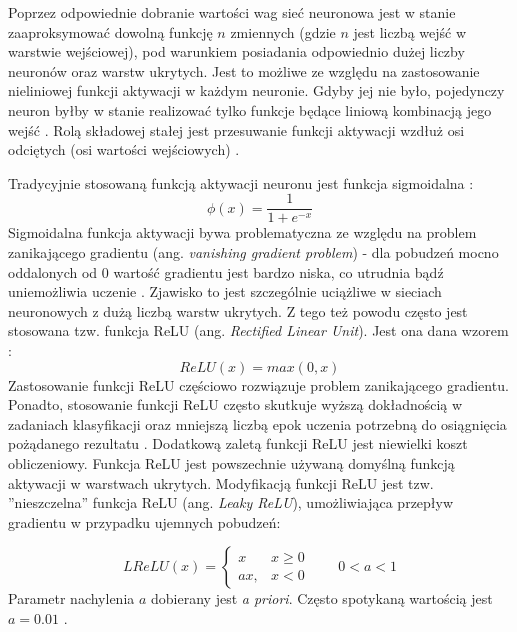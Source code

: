 \documentclass[notitlepage]{report}
\begin{document}
Poprzez odpowiednie dobranie wartości wag sieć neuronowa jest w stanie zaaproksymować dowolną funkcję $n$ zmiennych (gdzie $n$ jest liczbą wejść w warstwie wejściowej), pod warunkiem posiadania odpowiednio dużej liczby neuronów oraz warstw ukrytych. Jest to możliwe ze względu na zastosowanie nieliniowej funkcji aktywacji w każdym neuronie. Gdyby jej nie było, pojedynczy neuron byłby w stanie realizować tylko funkcje będące liniową kombinacją jego wejść \cite{cybenko} \cite{hornik}. Rolą składowej stałej jest przesuwanie funkcji aktywacji wzdłuż osi odciętych (osi wartości wejściowych) \cite{haykin}.

Tradycyjnie stosowaną funkcją aktywacji neuronu jest funkcja sigmoidalna \cite{haykin}:
\begin{equation}
\phi(x) = \frac{1}{1+e^{-x}}
\end{equation}
Sigmoidalna funkcja aktywacji bywa problematyczna ze względu na problem zanikającego gradientu (ang. \textit{vanishing gradient problem}) - dla pobudzeń mocno oddalonych od $0$ wartość gradientu jest bardzo niska, co utrudnia bądź uniemożliwia uczenie \cite{bengio} \cite{hochreiter}. Zjawisko to jest szczególnie uciążliwe w sieciach neuronowych z dużą liczbą warstw ukrytych. Z tego też powodu często jest stosowana tzw. funkcja ReLU (ang. \textit{Rectified Linear Unit}). Jest ona dana wzorem \cite{glorot}:
\begin{equation}
ReLU(x) = max(0,x)
\end{equation}
Zastosowanie funkcji ReLU częściowo rozwiązuje problem zanikającego gradientu. Ponadto, stosowanie funkcji ReLU często skutkuje wyższą dokładnością w zadaniach klasyfikacji oraz mniejszą liczbą epok uczenia potrzebną do osiągnięcia pożądanego rezultatu \cite{jarrett} \cite{glorot} \cite{nair}. Dodatkową zaletą funkcji ReLU jest niewielki koszt obliczeniowy. Funkcja ReLU jest powszechnie używaną domyślną funkcją aktywacji w warstwach ukrytych. Modyfikacją funkcji ReLU jest tzw. ''nieszczelna'' funkcja ReLU (ang. \textit{Leaky ReLU}), umożliwiająca przepływ gradientu w przypadku ujemnych pobudzeń:

\begin{equation}
LReLU(x) = \begin{cases}
x & x \geq 0 \\
ax, & x < 0
\end{cases} \qquad 0 < a < 1
\end{equation}
Parametr nachylenia $a$ dobierany jest \textit{a priori}. Często spotykaną wartością jest $a = 0.01$ \cite{goodfellow}.
\end{document}
